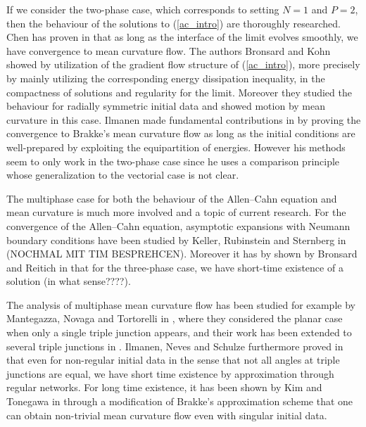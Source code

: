If we consider the two-phase case, which corresponds to setting $ N = 1 $ and $ 
P = 2 $, then 
the behaviour of the solutions to (\ref{ac_intro}) are thoroughly researched.
Chen has proven in 
\cite{chen_generation_and_propagation_of_interfaces_for_reaction_diffusion_equations}
that as long as the interface of the limit evolves smoothly, we have 
convergence to mean curvature flow.
The authors Bronsard and Kohn showed by utilization of the gradient flow 
structure of (\ref{ac_intro}), more precisely by mainly utilizing the 
corresponding energy dissipation inequality, in 
\cite{bronsard_kohn_motion_by_mean_curvature_as_singular_limit} the compactness 
of solutions and regularity for the limit. Moreover they studied the behaviour 
for radially symmetric initial data and showed motion by mean curvature in this 
case. 
Ilmanen made fundamental contributions in 
\cite{ilmanen_convergence_of_ac_to_brakkes_mcf} by proving the convergence to 
Brakke's mean curvature flow as long as the initial conditions are 
well-prepared by exploiting the equipartition of energies. However his methods 
seem to only work in the two-phase case since he uses a comparison principle 
whose generalization to the vectorial case is not clear.

The multiphase case for both the behaviour of the Allen--Cahn equation and mean 
curvature is much more involved and a topic of current research. For the 
convergence of the Allen--Cahn equation, asymptotic expansions  with Neumann 
boundary conditions 
have been studied by Keller, Rubinstein and Sternberg in 
\cite{keller_rubinstein_sternberg_fast_reaction_slow_diffusion} (NOCHMAL MIT 
TIM BESPREHCEN). Moreover it has by shown by Bronsard and 
Reitich in 
\cite{bronsard_reitich_on_three_phase_boundary_motion_and_singular_limit} that 
for the three-phase case, we have short-time existence of a solution (in what 
sense????). 

The analysis of multiphase mean curvature flow has been studied for example by 
Mantegazza, Novaga and Tortorelli in 
\cite{mantegazza_novaga_tortorelli_motion_by_curvature_of_planar_networks}, 
where they considered the planar case when only a single triple junction 
appears, and their work has been extended to several triple junctions in 
\cite{mantegazza_novaga_pluda_schule_evolution_of_networks_with_multiple_junctions}.
Ilmanen, Neves and Schulze furthermore proved in 
\cite{ilmanen_neves_schulze_on_short_time_existence_for_the_planar_network_flow}
that even for non-regular initial data in the sense that not all angles at 
triple junctions are equal, we have short time existence by approximation 
through regular networks. For long time existence, it has been shown by Kim and 
Tonegawa in \cite{kim_tonegawa_on_the_mean_curvature_flow_of_grain_boundaries} 
through a modification of Brakke's approximation scheme that one can obtain 
non-trivial mean curvature flow even with singular initial data.

